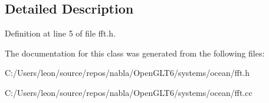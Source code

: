 \subsection{Detailed Description}


Definition at line 5 of file fft.\+h.



The documentation for this class was generated from the following files\+:\begin{DoxyCompactItemize}
\item 
C\+:/\+Users/leon/source/repos/nabla/\+Open\+G\+L\+T6/systems/ocean/fft.\+h\item 
C\+:/\+Users/leon/source/repos/nabla/\+Open\+G\+L\+T6/systems/ocean/fft.\+cc\end{DoxyCompactItemize}
